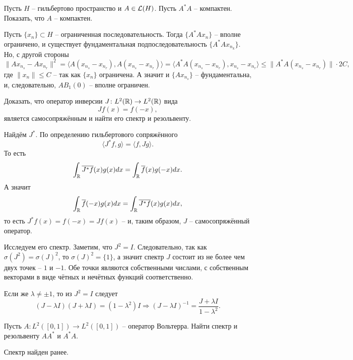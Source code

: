 \begin{task}[T7]
    Пусть $H$ -- гильбертово пространство и $A \in \mathcal{L}(H)$.
    Пусть $A^* A$ -- компактен.
    Показать, что $A$ -- компактен.
\end{task}
\begin{solution}
    Пусть $\{x_n\} \subset H$ -- ограниченная последовательность.
    Тогда $\{A^*A x_n\}$ -- вполне ограничено, и существует фундаментальная подпоследовательность $\{A^* A x_{n_k}\}$.
    Но, с другой стороны 
    \[
        \|Ax_{n_s} - Ax_{n_r}\|^2 = \langle A(x_{n_s} - x_{n_r}), A(x_{n_s} - x_{n_r}) \rangle = \langle A^* A (x_{n_s} - x_{n_r}), x_{n_s} - x_{n_r} \rangle \leq \|A^*A(x_{n_s} - x_{n_r})\| \cdot 2C,
    \]
    где $\|x_n\| \leq C$ -- так как $\{x_n\}$ ограничена.
    А значит и $\{Ax_{n_s}\}$ -- фундаментальна, и, следовательно, $AB_1(0)$ -- вполне ограничен.
\end{solution}
\begin{task}[T8]
    Доказать, что оператор инверсии $J\colon L^2(\mathbb{R}) \to L^2(\mathbb{R})$ вида
    \[
        Jf(x) = f(-x),
    \]
    является самосопряжённым и найти его спектр и резольвенту.
\end{task}
\begin{solution}
    Найдём $J^*$.
    По определению гильбертового сопряжённого
    \[
        \langle J^* f, g\rangle = \langle f, Jg \rangle.
    \]
    То есть
    \[
        \int_{\mathbb{R}} \overline{J^* f}(x)g(x)dx = \int_{\mathbb{R}}\overline{f}(x)g(-x)dx.
    \]
    А значит
    \[
        \int_{\mathbb{R}} \overline{f}(-x)g(x)dx = \int_{\mathbb{R}} \overline{J^* f}(x)g(x)dx,
    \]
    то есть $J^* f(x) = f(-x) = J f(x)$ -- и, таким образом, $J$ -- самосопряжённый оператор.

    Исследуем его спектр.
    Заметим, что $J^2 = I$.
    Следовательно, так как $\sigma(J^2) = \sigma(J)^2$, то $\sigma(J)^2 = \{1\}$, а значит спектр $J$ состоит из не более чем двух точек -- $1$ и $-1$.
    Обе точки являются собственными числами, с собственным векторами в виде чётных и нечётных функций соответственно.

    Если же $\lambda \neq \pm 1$, то из $J^2 = I$ следует
    \[
        (J - \lambda I)(J + \lambda I) = (1 - \lambda^2)I \Rightarrow (J -\lambda I)^{-1} = \frac{J + \lambda I}{1 - \lambda^2}.
    \]
\end{solution}
\begin{task}[T9]
    Пусть $A\colon L^2([0, 1]) \to L^2([0, 1])$ -- оператор Вольтерра.
    Найти спектр и резольвенту $AA^*$ и $A^* A$.
\end{task}
\begin{solution}
    Спектр найден ранее.


\end{solution}
